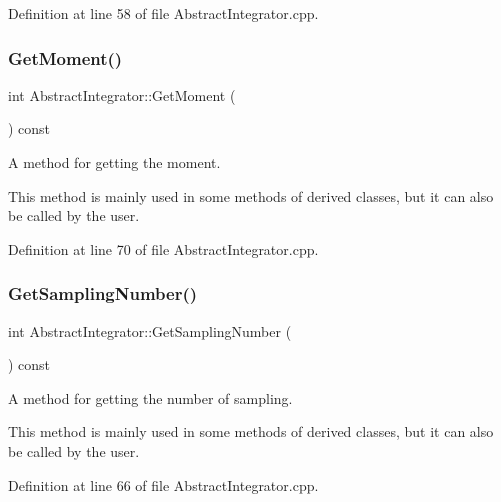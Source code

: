 Definition at line 58 of file Abstract\+Integrator.\+cpp.

\mbox{\label{class_abstract_integrator_a7f709ab302dfe70b5f0f2ce80456fcdb}} 
\subsubsection{\texorpdfstring{Get\+Moment()}{GetMoment()}}
{\footnotesize\ttfamily int Abstract\+Integrator\+::\+Get\+Moment (\begin{DoxyParamCaption}{ }\end{DoxyParamCaption}) const}



A method for getting the moment. 

This method is mainly used in some methods of derived classes, but it can also be called by the user. 

Definition at line 70 of file Abstract\+Integrator.\+cpp.

\mbox{\label{class_abstract_integrator_ac58629ec6822b3beeefdd1323b627704}} 
\subsubsection{\texorpdfstring{Get\+Sampling\+Number()}{GetSamplingNumber()}}
{\footnotesize\ttfamily int Abstract\+Integrator\+::\+Get\+Sampling\+Number (\begin{DoxyParamCaption}{ }\end{DoxyParamCaption}) const}



A method for getting the number of sampling. 

This method is mainly used in some methods of derived classes, but it can also be called by the user. 

Definition at line 66 of file Abstract\+Integrator.\+cpp.

\mbox{\label{class_abstract_integrator_a864fe7dc9aa1ff0b36da0b8f361a5b69}} 
